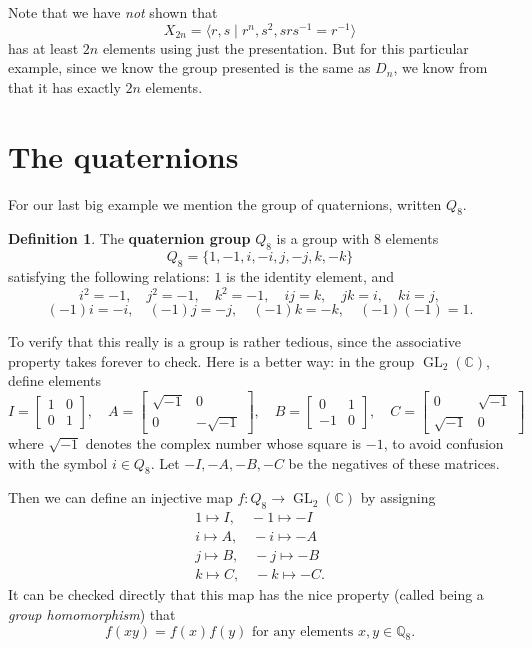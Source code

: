 \documentclass[12pt]{report}
\numberwithin{equation}{section}
\numberwithin{theorem}{chapter}
\theoremstyle{definition}
\newtheorem{definition}[theorem]{Definition}
\newtheorem*{basic properties}{Basic Properties}
\newtheorem*{Important Remark}{Important Remark}
\newcommand{\df}[1]{{\bf #1}\index{#1}}
\DeclareMathOperator{\GL}{GL}
\newcommand{\Q}{\mathbb{Q}}
\newcommand{\C}{\mathbb{C}}
\begin{document}
Note that we have {\em not} shown that
$$X_{2n}=\langle r,s \mid r^n, s^2, srs^{-1} = r^{-1} \rangle$$
has at least $2n$ elements using just the presentation. But for this particular example, since we know the group presented is the same as $D_n$, we know from  that it has exactly $2n$ elements.






\section{The quaternions}\label{quaternions}


For our last big example we mention the group of quaternions, written $Q_8$. 

\begin{definition}
The \df{quaternion group} $Q_8$ is a group with $8$ elements 
$$Q_8=\{ 1, -1, i, -i, j, -j, k, -k \}  $$
satisfying  the following relations:  $1$ is the identity element, and 
$$i^2 = -1, \quad j^2 = -1, \quad k^2 =-1, \quad ij = k, \quad jk = i, \quad ki = j, $$
$$(-1)i = -i, \quad (-1)j = -j, \quad (-1)k = -k, \quad (-1)(-1) = 1.$$
\end{definition}

To verify that this really is a group is rather tedious, since the associative property takes forever to check. Here is a better way: in the group $\GL_2(\C)$, define elements
$$
I = 
\begin{bmatrix}
1 & 0 \\ 0 & 1
\end{bmatrix},
\quad
A =  
\begin{bmatrix}
\sqrt{-1} & 0 \\ 0 & -\sqrt{-1} 
\end{bmatrix},
\quad 
B =  \begin{bmatrix}
0 & 1 \\ -1 & 0 
\end{bmatrix},
\quad
C =  \begin{bmatrix}
0 & \sqrt{-1} \\ \sqrt{-1} & 0 
\end{bmatrix}
$$
where $\sqrt{-1}$ denotes the complex number whose square is $-1$, to avoid confusion with the symbol $i \in Q_8$.
Let $-I, -A, -B, -C$ be the negatives of these matrices. 

Then we can define an injective map $f:Q_8\to \GL_2(\C)$ by assigning 
\begin{eqnarray*}
1\mapsto  I,  \quad  -1\mapsto  -I\\
 i\mapsto  A, \quad -i\mapsto -A \\
 j\mapsto B, \quad  -j\mapsto -B \\
 k\mapsto C, \quad  -k\mapsto -C.
\end{eqnarray*}
It can be checked directly that this map has the nice property (called being a {\em group homomorphism}) that 
$$f(xy)=f(x)f(y) \text{ for any elements } x,y\in \Q_8.$$
\end{document}
